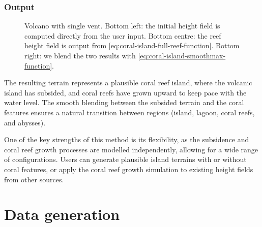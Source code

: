 \subsubsection{Output}
\label{sec:coral-island-procedural-output}

\begin{figure}
\caption{Volcano with single vent. Bottom left: the initial height field is computed directly from the user input. Bottom centre: the reef height field is output from \cref{eq:coral-island-full-reef-function}. Bottom right: we blend the two results with \cref{eq:coral-island-smoothmax-function}.}
\label{fig:coral-island-volcano-example}
\end{figure}

The resulting terrain represents a plausible coral reef island, where the volcanic island has subsided, and coral reefs have grown upward to keep pace with the water level. The smooth blending between the subsided terrain and the coral features ensures a natural transition between regions (island, lagoon, coral reefs, and abysses).

One of the key strengths of this method is its flexibility, as the subsidence and coral reef growth processes are modelled independently, allowing for a wide range of configurations. Users can generate plausible island terrains with or without coral features, or apply the coral reef growth simulation to existing height fields from other sources.



\section{Data generation}
\label{sec:coral-island-dataset-generation}



